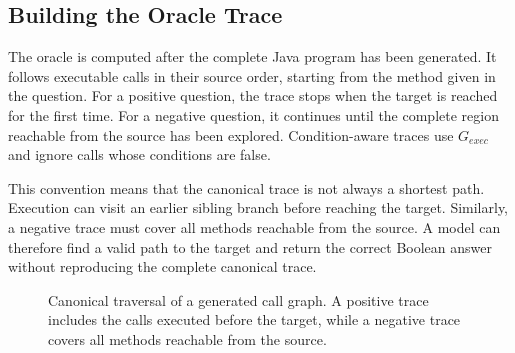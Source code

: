\subsection{Building the Oracle Trace}

The oracle is computed after the complete Java program has been generated. It follows executable calls in their source order, starting from the method given in the question. For a positive question, the trace stops when the target is reached for the first time. For a negative question, it continues until the complete region reachable from the source has been explored. Condition-aware traces use $G_{\mathit{exec}}$ and ignore calls whose conditions are false.

This convention means that the canonical trace is not always a shortest path. Execution can visit an earlier sibling branch before reaching the target. Similarly, a negative trace must cover all methods reachable from the source. A model can therefore find a valid path to the target and return the correct Boolean answer without reproducing the complete canonical trace.

\begin{figure}[t]
\centering
{}
\caption{Canonical traversal of a generated call graph. A positive trace includes the calls executed before the target, while a negative trace covers all methods reachable from the source.}
\label{fig:canonical-traversal}
\end{figure}

